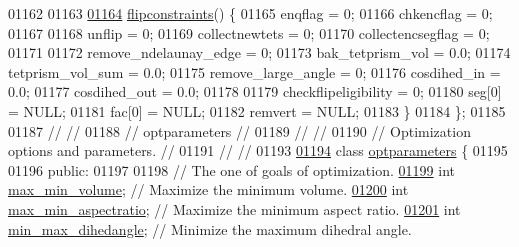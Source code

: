 \begin{DoxyCode}
01162 
01163 
\hypertarget{tetgen_8h_source.tex_l01164}{}\hyperlink{classtetgenmesh_1_1flipconstraints_a4bd90cc95400ddb895ad45d7e5b72f4e}{01164}     \hyperlink{classtetgenmesh_1_1flipconstraints_a4bd90cc95400ddb895ad45d7e5b72f4e}{flipconstraints}() \{
01165       enqflag = 0; 
01166       chkencflag = 0;
01167 
01168       unflip = 0;
01169       collectnewtets = 0;
01170       collectencsegflag = 0;
01171 
01172       remove\_ndelaunay\_edge = 0;
01173       bak\_tetprism\_vol = 0.0;
01174       tetprism\_vol\_sum = 0.0;
01175       remove\_large\_angle = 0;
01176       cosdihed\_in = 0.0;
01177       cosdihed\_out = 0.0;
01178 
01179       checkflipeligibility = 0;
01180       seg[0] = NULL;
01181       fac[0] = NULL;
01182       remvert = NULL;
01183     \}
01184   \};
01185 
01187 \textcolor{comment}{//                                                                           //}
01188 \textcolor{comment}{// optparameters                                                             //}
01189 \textcolor{comment}{//                                                                           //}
01190 \textcolor{comment}{// Optimization options and parameters.                                      //}
01191 \textcolor{comment}{//                                                                           //}
01193 \textcolor{comment}{}
\hypertarget{tetgen_8h_source.tex_l01194}{}\hyperlink{classtetgenmesh_1_1optparameters}{01194}   \textcolor{keyword}{class }\hyperlink{classtetgenmesh_1_1optparameters}{optparameters} \{
01195 
01196   \textcolor{keyword}{public}:
01197 
01198     \textcolor{comment}{// The one of goals of optimization.}
\hypertarget{tetgen_8h_source.tex_l01199}{}\hyperlink{classtetgenmesh_1_1optparameters_ac9adc44bb0076f3b2e5c11c0bf831278}{01199}     \textcolor{keywordtype}{int} \hyperlink{classtetgenmesh_1_1optparameters_ac9adc44bb0076f3b2e5c11c0bf831278}{max\_min\_volume};      \textcolor{comment}{// Maximize the minimum volume.}
\hypertarget{tetgen_8h_source.tex_l01200}{}\hyperlink{classtetgenmesh_1_1optparameters_a844aa0c436ff6021d3c1f7132584faa6}{01200}     \textcolor{keywordtype}{int} \hyperlink{classtetgenmesh_1_1optparameters_a844aa0c436ff6021d3c1f7132584faa6}{max\_min\_aspectratio}; \textcolor{comment}{// Maximize the minimum aspect ratio.}
\hypertarget{tetgen_8h_source.tex_l01201}{}\hyperlink{classtetgenmesh_1_1optparameters_ab391511f633b84180d0e6cc52510e343}{01201}     \textcolor{keywordtype}{int} \hyperlink{classtetgenmesh_1_1optparameters_ab391511f633b84180d0e6cc52510e343}{min\_max\_dihedangle};  \textcolor{comment}{// Minimize the maximum dihedral angle. }

\end{DoxyCode}
